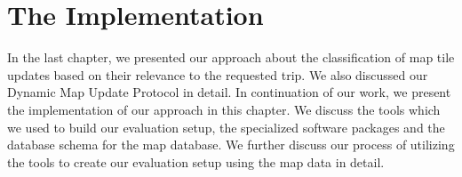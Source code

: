 \chapter{The Implementation}\label{ch:implementation} %
In the last chapter, we presented our approach about the classification of map tile updates based on their relevance to the requested trip. We also discussed our Dynamic Map Update Protocol in detail. In continuation of our work, we present the implementation of our approach in this chapter. We discuss the tools which we used to build our evaluation setup, the specialized software packages and the database schema for the map database. We further discuss our process of utilizing the tools to create our evaluation setup using the map data in detail. 

